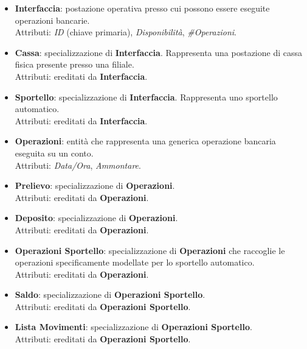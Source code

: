 \begin{itemize}
  \item \textbf{Interfaccia}: postazione operativa presso cui possono essere eseguite operazioni bancarie.\\
  Attributi: \textit{ID} (chiave primaria), \textit{Disponibilità}, \textit{\#Operazioni}.

  \item \textbf{Cassa}: specializzazione di \textbf{Interfaccia}. Rappresenta una postazione di cassa fisica presente presso una filiale.\\
  Attributi: ereditati da \textbf{Interfaccia}.

  \item \textbf{Sportello}: specializzazione di \textbf{Interfaccia}. Rappresenta uno sportello automatico.\\
  Attributi: ereditati da \textbf{Interfaccia}.

  \item \textbf{Operazioni}: entità che rappresenta una generica operazione bancaria eseguita su un conto.\\
  Attributi: \textit{Data/Ora}, \textit{Ammontare}.

  \item \textbf{Prelievo}: specializzazione di \textbf{Operazioni}.\\
  Attributi: ereditati da \textbf{Operazioni}.

  \item \textbf{Deposito}: specializzazione di \textbf{Operazioni}.\\
  Attributi: ereditati da \textbf{Operazioni}.

  \item \textbf{Operazioni Sportello}: specializzazione di \textbf{Operazioni} che raccoglie le operazioni specificamente modellate per lo sportello automatico.\\
  Attributi: ereditati da \textbf{Operazioni}.

  \item \textbf{Saldo}: specializzazione di \textbf{Operazioni Sportello}.\\
  Attributi: ereditati da \textbf{Operazioni Sportello}.

  \item \textbf{Lista Movimenti}: specializzazione di \textbf{Operazioni Sportello}.\\
  Attributi: ereditati da \textbf{Operazioni Sportello}.
\end{itemize}

